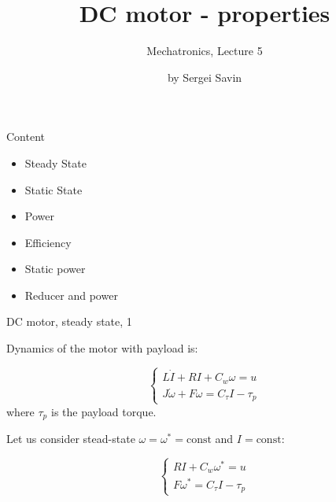 \documentclass{beamer}
\title{DC motor - properties}
\subtitle{Mechatronics, Lecture 5}
\author{by Sergei Savin}
\date{\mydate}
\begin{document}
\maketitle



\begin{frame}{Content}
\begin{itemize}
\item Steady State
\item Static State
\item Power
\item Efficiency
\item Static power
\item Reducer and power
\end{itemize}
\end{frame}





\begin{frame}{DC motor, steady state, 1}
	\begin{flushleft}
		
		Dynamics of the motor with payload is:
		
		\begin{equation}
			\begin{cases}
				L \dot I + RI + C_w \omega = u \\
				J \dot \omega + F \omega = C_\tau I - \tau_p
			\end{cases}
		\end{equation}
	where $\tau_p$ is the payload torque.
	
	\bigskip
	
	Let us consider stead-state $\omega = \omega^* = \text{const}$ and $I = \text{const}$:
	
	\begin{equation}
		\begin{cases}
			RI + C_w \omega^* = u \\
			F \omega^* = C_\tau I - \tau_p
		\end{cases}
	\end{equation}
	
		
	\end{flushleft}
\end{frame}
\end{document}
